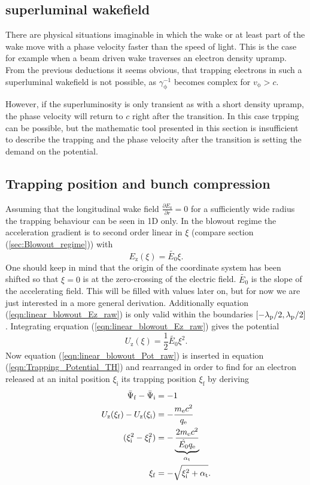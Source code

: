 \subsection*{superluminal wakefield}
There are physical situations imaginable in which the wake or at least part of the wake move with a phase velocity faster than the speed of light. This is the case for example when a beam driven wake traverses an electron density upramp.
From the previous deductions it seems obvious, that trapping electrons in such a superluminal wakefield is not possible, as $\gamma_\mathrm{\phi}^{-1}$ becomes complex for $v_\mathrm{\phi}>c$.

However, if the superluminosity is only transient as with a short density upramp, the phase velocity will return to $c$ right after the transition. In this case trpping can be possible, but the mathematic tool presented in this section is insufficient to describe the trapping and the phase velocity after the transition is setting the demand on the potential.
\subsection{Trapping position and bunch compression}
Assuming that the longitudinal wake field 
$\frac{\partial E_\mathrm{z}}{\partial r} = 0 $ for a sufficiently wide radius the trapping behaviour can be seen in 1D only.
In the blowout regime the acceleration gradient is to second order linear in $\xi$ (compare section (\ref{sec:Blowout_regime})) with
\begin{equation}
\label{eqn:linear_blowout_Ez_raw}
E_\mathrm{z}(\xi)=\tilde{E_0}\xi.
\end{equation}
One should keep in mind that the origin of the coordinate system has been shifted so that $\xi=0$ is at the zero-crossing of the electric field. $\tilde{E_0}$ is the slope of the accelerating field. This will be filled with values later on, but for now we are just interested in a more general derivation. Additionally equation (\ref{eqn:linear_blowout_Ez_raw}) is only valid within the boundaries $[-\lambda_\mathrm{p}/2,\lambda_\mathrm{p}/2]$.
Integrating erquation (\ref{eqn:linear_blowout_Ez_raw}) gives the potential
\begin{equation}
\label{eqn:linear_blowout_Pot_raw}
U_\mathrm{z}(\xi)=\frac{1}{2}\tilde{E_0}\xi^2.
\end{equation}
Now equation (\ref{eqn:linear_blowout_Pot_raw}) is inserted in equation (\ref{eqn:Trapping_Potential_TH}) and rearranged in order to find for an electron released at an inital position $\xi_\mathrm{i}$ its trapping position $\xi_\mathrm{f}$ by deriving
\begin{align}
\bar{\Psi}_\mathrm{f}-\bar{\Psi}_\mathrm{i}&=-1\\
U_\mathrm{z}(\xi_\mathrm{f})-U_\mathrm{z}(\xi_\mathrm{i})&=-\frac{m_\mathrm{e} c^2}{q_\mathrm{e}}\\
(\xi_\mathrm{i}^2-\xi_\mathrm{f}^2)&=-\underbrace{\frac{2m_\mathrm{e} c^2}{\hat{E_0}q_\mathrm{e}}}_{\alpha_\mathrm{t}}\\
\label{eqn:Trapping_Position}
\xi_\mathrm{f}&=-\sqrt{\xi_\mathrm{i}^2+\alpha_\mathrm{t}}.
\end{align}

